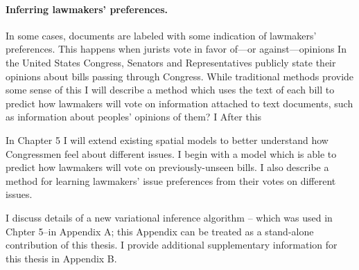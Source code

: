 \paragraph{Inferring lawmakers' preferences.}
In some cases, documents are labeled with some indication of
lawmakers' preferences.  This happens when jurists vote in favor
of---or against---opinions In the United States Congress, Senators and
Representatives publicly state their opinions about bills passing
through Congress.  While traditional methods provide some sense of
this I will describe a method which uses the text of each bill to
predict how lawmakers will vote on information attached to text
documents, such as information about peoples' opinions of them?  I
After this


In Chapter 5 I will extend existing spatial models to better
understand how Congressmen feel about different issues.  I begin with a
model which is able to predict how lawmakers will vote on previously-unseen
bills. I also describe a method for learning lawmakers' issue preferences 
from their votes on different issues.

I discuss details of a new variational inference algorithm -- which
was used in Chpter 5--in Appendix A; this Appendix can be treated as a
stand-alone contribution of this thesis.  I provide additional
supplementary information for this thesis in Appendix B.
